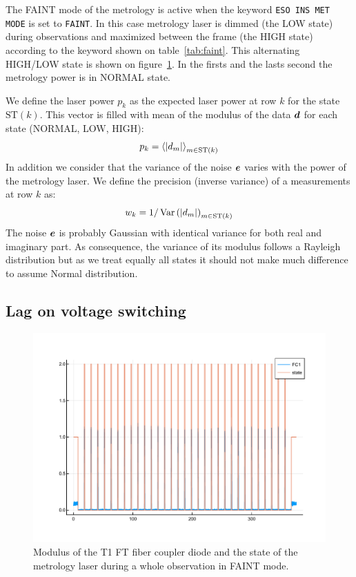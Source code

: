 \documentclass[a4paper,11pt,twoside]{scrartcl}
\begin{document}
The FAINT mode of the metrology is active when the keyword \verb|ESO INS MET MODE| is set to \verb|FAINT|. In this case metrology laser is dimmed (the LOW state) during observations and maximized between the frame (the HIGH state) according to the keyword shown on table~\ref{tab:faint}.  This alternating HIGH/LOW state is shown on figure~\ref{fig:faint}. In the firsts and the lasts second the metrology power is in NORMAL state.

We define the laser power $p_k$ as the expected laser power at row $k$ for the state $\textrm{ST}(k)$. This vector is filled with   mean of the modulus of the data $\boldsymbol{d}$  for each state (NORMAL, LOW, HIGH):
\begin{equation}
    p_k = \left\langle \left\vert d_m\right\vert\right\rangle_{m\in \textrm{ST}(k)}
\end{equation}
In addition we consider that the variance of the noise $\boldsymbol{e}$ varies with the power of the metrology laser. We define the precision (\ie inverse variance) of a measurements at row $k$ as:
\begin{equation}
    w_k = 1/\Var\left(\Abs{d_m}\right)_{m\in \textrm{ST}(k)}
\end{equation}
The noise $\boldsymbol{e}$ is probably Gaussian with identical variance for both real and imaginary part. As consequence, the variance of its modulus follows a Rayleigh distribution but as we treat equally all states it should not make much difference to assume Normal distribution.

\subsection{Lag on voltage switching}
\begin{figure}
    \centering
    \includegraphics[width=0.8\linewidth]{figs/FaintStates.pdf}
    \caption{Modulus of the T1 FT fiber coupler diode and the state of the metrology laser during a whole observation in FAINT mode.}
    \label{fig:faint}
\end{figure}
\end{document}
